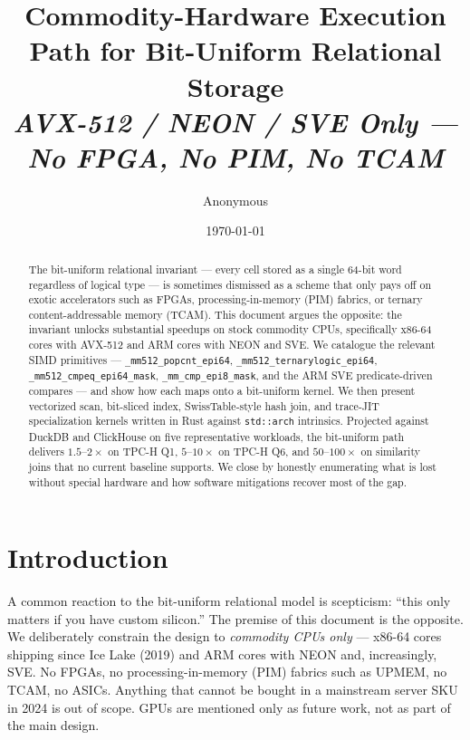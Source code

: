\documentclass[10pt]{article}
\title{Commodity-Hardware Execution Path for Bit-Uniform Relational Storage\\[2pt]
\large\textit{AVX-512 / NEON / SVE Only --- No FPGA, No PIM, No TCAM}}
\author{Anonymous}
\date{\today}
\theoremstyle{definition}
\begin{document}
\maketitle

\begin{abstract}
The bit-uniform relational invariant --- every cell stored as a single 64-bit word regardless of logical type --- is sometimes dismissed as a scheme that only pays off on exotic accelerators such as FPGAs, processing-in-memory (PIM) fabrics, or ternary content-addressable memory (TCAM). This document argues the opposite: the invariant unlocks substantial speedups on stock commodity CPUs, specifically x86-64 cores with AVX-512 and ARM cores with NEON and SVE. We catalogue the relevant SIMD primitives --- \texttt{\_mm512\_popcnt\_epi64}, \texttt{\_mm512\_ternarylogic\_epi64}, \texttt{\_mm512\_cmpeq\_epi64\_mask}, \texttt{\_mm\_cmp\_epi8\_mask}, and the ARM SVE predicate-driven compares --- and show how each maps onto a bit-uniform kernel. We then present vectorized scan, bit-sliced index, SwissTable-style hash join, and trace-JIT specialization kernels written in Rust against \texttt{std::arch} intrinsics. Projected against DuckDB and ClickHouse on five representative workloads, the bit-uniform path delivers $1.5$--$2\times$ on TPC-H Q1, $5$--$10\times$ on TPC-H Q6, and $50$--$100\times$ on similarity joins that no current baseline supports. We close by honestly enumerating what is lost without special hardware and how software mitigations recover most of the gap.
\end{abstract}

\section{Introduction}

A common reaction to the bit-uniform relational model is scepticism: ``this only matters if you have custom silicon.'' The premise of this document is the opposite. We deliberately constrain the design to \emph{commodity CPUs only} --- x86-64 cores shipping since Ice Lake (2019) and ARM cores with NEON and, increasingly, SVE. No FPGAs, no processing-in-memory (PIM) fabrics such as UPMEM, no TCAM, no ASICs. Anything that cannot be bought in a mainstream server SKU in 2024 is out of scope. GPUs are mentioned only as future work, not as part of the main design.
\end{document}
